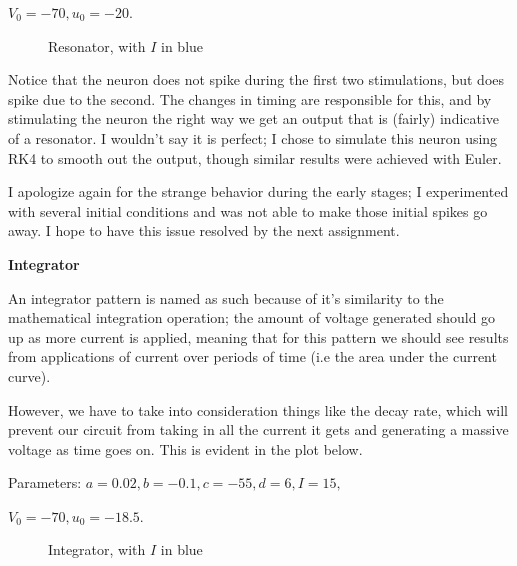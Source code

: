 \documentclass[a4paper,12pt]{article}
\begin{document}
\vspace{1mm}

$V_{0}=-70, u_{0}=-20$. 

\begin{figure}[h!]
\begin{center}
\end{center}
\caption{\label{pict11}Resonator, with $I$ in blue}
\end{figure}

Notice that the neuron does not spike during the first two stimulations, but does spike due to the second. The changes in timing are responsible for this, and by stimulating the neuron the right way we get an output that is (fairly) indicative of a resonator. I wouldn't say it is perfect; I chose to simulate this neuron using RK4 to smooth out the output, though similar results were achieved with Euler. 

\vspace{2mm}

I apologize again for the strange behavior during the early stages; I experimented with several initial conditions and was not able to make those initial spikes go away. I hope to have this issue resolved by the next assignment. 

\vfil\eject

{\bf Integrator}
\bigskip

An integrator pattern is named as such because of it's similarity to the mathematical integration operation; the amount of voltage generated should go up as more current is applied, meaning that for this pattern we should see results from applications of current over periods of time (i.e the area under the current curve). 

\vspace{2mm}

However, we have to take into consideration things like the decay rate, which will prevent our circuit from taking in all the current it gets and generating a massive voltage as time goes on. This is evident in the plot below. 
\vspace{2mm} 

Parameters: $a=0.02, b=-0.1, c=-55, d=6, I=15, $

\vspace{1mm}

$V_{0}=-70, u_{0}=-18.5$. 

\begin{figure}[h!]
\begin{center}
\end{center}
\caption{\label{pict12}Integrator, with $I$ in blue}
\end{figure}
\end{document}
